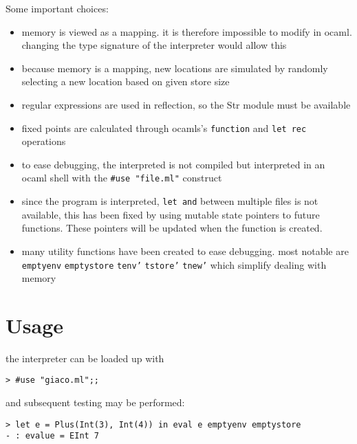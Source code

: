 \documentclass[11pt]{article}
\begin{document}
Some important choices:
\begin{itemize}
\item memory is viewed as a mapping. it is therefore impossible to modify in ocaml. changing the type signature of the interpreter would allow this
\item because memory is a mapping, new locations are simulated by randomly selecting a new location based on given store size
\item regular expressions are used in reflection, so the Str module must be available
\item fixed points are calculated through ocamls's \texttt{function} and \texttt{let rec} operations
\item to ease debugging, the interpreted is not compiled but interpreted in an ocaml shell with the \texttt{\#use "file.ml"} construct
\item since the program is interpreted, \texttt{let and} between multiple files is not available, this has been fixed by using mutable state pointers to future functions. These pointers will be updated
when the function is created.
\item many utility functions have been created to ease debugging. most notable are \texttt{emptyenv} \texttt{emptystore} \texttt{tenv'} \texttt{tstore'} \texttt{tnew'} which simplify dealing with memory
\end{itemize}
\section{Usage}
\label{sec:org680e19c}
the interpreter can be loaded up with
\begin{verbatim}
> #use "giaco.ml";;
\end{verbatim}

and subsequent testing may be performed:
\begin{verbatim}
> let e = Plus(Int(3), Int(4)) in eval e emptyenv emptystore
- : evalue = EInt 7
\end{verbatim}
\end{document}
